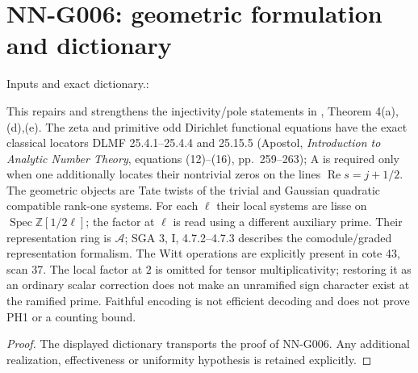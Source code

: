 \section{NN-G006: geometric formulation and dictionary}
\begin{geometricstatement}[NN-G006]
Inputs and exact dictionary.:

This repairs and strengthens the injectivity/pole statements in
,
Theorem 4(a),(d),(e). The zeta and primitive odd Dirichlet functional
equations have the exact classical locators DLMF 25.4.1--25.4.4
and 25.15.5 (Apostol, \emph{Introduction to Analytic Number
Theory}, equations (12)--(16), pp.\ 259--263); A is required only when
one additionally locates their nontrivial zeros on the lines
$\operatorname{Re}s=j+1/2$. The geometric objects are Tate twists
of the trivial and Gaussian quadratic compatible rank-one systems.
For each $\ell$ their local systems are lisse on
$\operatorname{Spec}\mathbb Z[1/2\ell]$; the factor at $\ell$
is read using a different auxiliary prime. Their representation
ring is $\mathcal A$; SGA 3, I, 4.7.2--4.7.3 describes the
comodule/graded representation formalism. The Witt operations
are explicitly present in cote 43, scan 37. The local factor at
$2$ is omitted for tensor multiplicativity; restoring it as an
ordinary scalar correction does not make an unramified sign
character exist at the ramified prime. Faithful encoding is not
efficient decoding and does not prove PH1 or a counting bound.


\end{geometricstatement}
\begin{proof} The displayed dictionary transports the proof of NN-G006. Any additional realization, effectiveness or uniformity hypothesis is retained explicitly.\end{proof}


